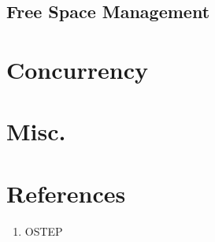 \documentclass[10pt]{report}
\begin{document}
\section{Free Space Management}
\chapter{Concurrency}
\chapter{Misc.}
\chapter{References}
\begin{enumerate}
\item OSTEP
\end{enumerate}
\end{document}
